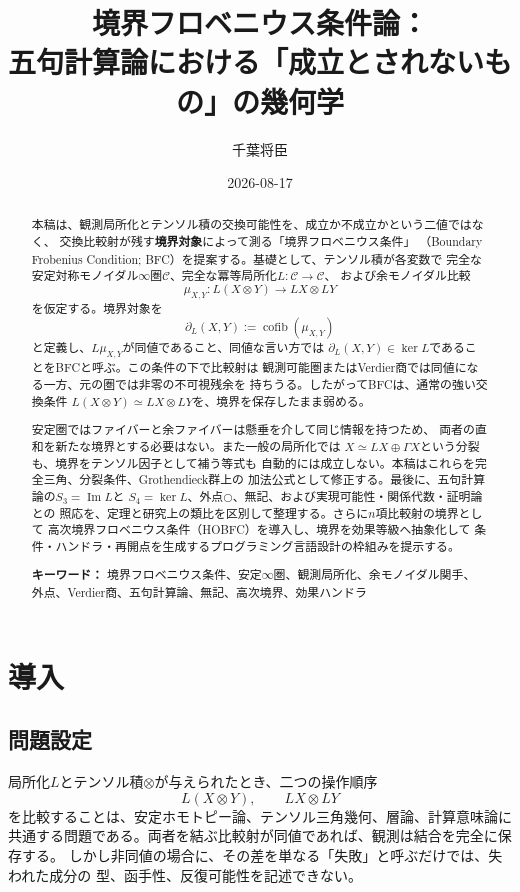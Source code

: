 \documentclass[11pt,a4paper]{ltjsarticle}
\title{境界フロベニウス条件論：\\
五句計算論における「成立とされないもの」の幾何学}
\author{千葉将臣}
\date{2026-08-17}
\theoremstyle{definition}
\theoremstyle{remark}
\newcommand{\C}{\mathcal{C}}
\newcommand{\cofib}{\operatorname{cofib}}
\newcommand{\im}{\operatorname{Im}}
\newcommand{\Boundary}{\partial_L}
\newcommand{\Residual}{\Gamma}
\begin{document}
\maketitle

\begin{abstract}
本稿は、観測局所化とテンソル積の交換可能性を、成立か不成立かという二値ではなく、
交換比較射が残す\textbf{境界対象}によって測る「境界フロベニウス条件」
（Boundary Frobenius Condition; BFC）を提案する。基礎として、テンソル積が各変数で
完全な安定対称モノイダル$\infty$圏$\C$、完全な冪等局所化$L:\C\to\C$、
および余モノイダル比較
\[
 \mu_{X,Y}:L(X\otimes Y)\longrightarrow LX\otimes LY
\]
を仮定する。境界対象を
\[
 \Boundary(X,Y):=\cofib(\mu_{X,Y})
\]
と定義し、$L\mu_{X,Y}$が同値であること、同値な言い方では
$\Boundary(X,Y)\in\ker L$であることをBFCと呼ぶ。この条件の下で比較射は
観測可能圏またはVerdier商では同値になる一方、元の圏では非零の不可視残余を
持ちうる。したがってBFCは、通常の強い交換条件
$L(X\otimes Y)\simeq LX\otimes LY$を、境界を保存したまま弱める。

安定圏ではファイバーと余ファイバーは懸垂を介して同じ情報を持つため、
両者の直和を新たな境界とする必要はない。また一般の局所化では
$X\simeq LX\oplus\Residual X$という分裂も、境界をテンソル因子として補う等式も
自動的には成立しない。本稿はこれらを完全三角、分裂条件、Grothendieck群上の
加法公式として修正する。最後に、五句計算論の$S_3=\im L$と
$S_4=\ker L$、外点$\bigcirc$、無記、および実現可能性・関係代数・証明論との
照応を、定理と研究上の類比を区別して整理する。さらに$n$項比較射の境界として
高次境界フロベニウス条件（HOBFC）を導入し、境界を効果等級へ抽象化して
条件・ハンドラ・再開点を生成するプログラミング言語設計の枠組みを提示する。

\medskip
\noindent\textbf{キーワード：}
境界フロベニウス条件、安定$\infty$圏、観測局所化、余モノイダル関手、
外点、Verdier商、五句計算論、無記、高次境界、効果ハンドラ
\end{abstract}

\tableofcontents

\section{導入}

\subsection{問題設定}

局所化$L$とテンソル積$\otimes$が与えられたとき、二つの操作順序
\[
 L(X\otimes Y),\qquad LX\otimes LY
\]
を比較することは、安定ホモトピー論、テンソル三角幾何、層論、計算意味論に
共通する問題である。両者を結ぶ比較射が同値であれば、観測は結合を完全に保存する。
しかし非同値の場合に、その差を単なる「失敗」と呼ぶだけでは、失われた成分の
型、函手性、反復可能性を記述できない。
\end{document}
